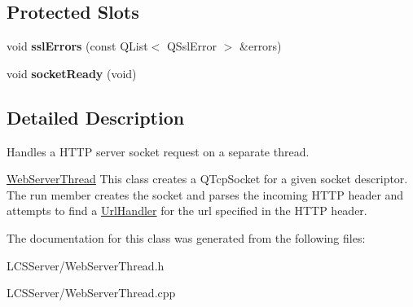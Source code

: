 \subsection*{Protected Slots}
\begin{DoxyCompactItemize}
\item 
\mbox{\label{class_web_server_thread_a0f1be6520913476c42b6b7781749af08}} 
void {\bfseries ssl\+Errors} (const Q\+List$<$ Q\+Ssl\+Error $>$ \&errors)
\item 
\mbox{\label{class_web_server_thread_ab0c66c93e66597e8718a1586543451a1}} 
void {\bfseries socket\+Ready} (void)
\end{DoxyCompactItemize}


\subsection{Detailed Description}
Handles a H\+T\+TP server socket request on a separate thread. 

\hyperlink{class_web_server_thread}{Web\+Server\+Thread} This class creates a Q\+Tcp\+Socket for a given socket descriptor. The run member creates the socket and parses the incoming H\+T\+TP header and attempts to find a \hyperlink{class_url_handler}{Url\+Handler} for the url specified in the H\+T\+TP header. 

The documentation for this class was generated from the following files\+:\begin{DoxyCompactItemize}
\item 
L\+C\+S\+Server/Web\+Server\+Thread.\+h\item 
L\+C\+S\+Server/Web\+Server\+Thread.\+cpp\end{DoxyCompactItemize}
